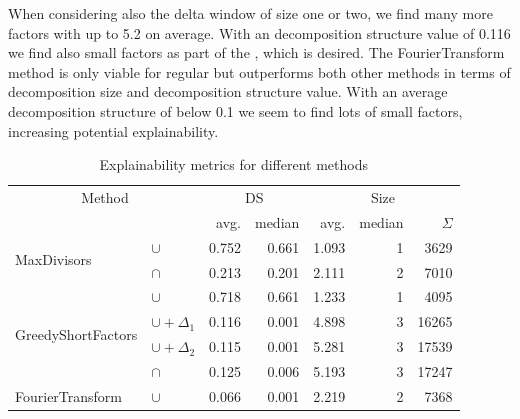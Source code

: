 When considering also the delta window of size one or two, we find many more factors with up to 5.2 on average.
With an decomposition structure value of 0.116 we find also small factors as part of the \orDecomp, which is desired.
The FourierTransform method is only viable for regular \orDecomp but outperforms both other methods in terms of decomposition size and decomposition structure value.
With an average decomposition structure of below 0.1 we seem to find lots of small factors, increasing potential explainability.
\begin{table}[b]
	\centering
	\begin{tabular}{ll|rr|rrr}
		\multicolumn{2}{c}{Method} &  \multicolumn{2}{c}{DS} & \multicolumn{3}{c}{Size}  \\
		& & avg. & median & avg. & median & $\Sigma$ \\
		\hline
		\multirow{2}{*}{MaxDivisors} 
		& $\cup$ & 0.752 & 0.661 &  1.093 & 1 & 3629 \\
		& $\cap$ & 0.213 & 0.201  & 2.111 & 2 & 7010 \\
		\hline
		\multirow{4}{*}{GreedyShortFactors}
		& $\cup$ & 0.718 & 0.661  & 1.233 & 1 & 4095\\
		& $\cup + \Delta_1$ & 0.116 & 0.001   & 4.898 & 3& 16265\\
		& $\cup + \Delta_2$ & 0.115 & 0.001   & 5.281 & 3& 17539\\
		& $\cap$  & 0.125 & 0.006 & 5.193 & 3  & 17247\\
		\hline
		FourierTransform & $\cup$ & 0.066 & 0.001 & 2.219 & 2  & 7368\\
	\end{tabular}
	\caption{Explainability metrics for different methods}
	\label{tab:eval-metric}
\end{table}


